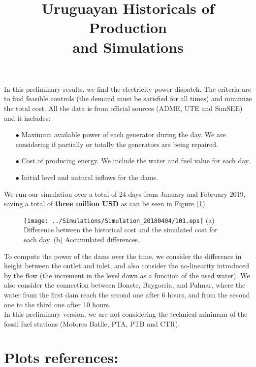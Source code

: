 \documentclass[12pt]{article}
\theoremstyle{definition}
\theoremstyle{remark}
\begin{document}
\title{Uruguayan Historicals of Production\\
and Simulations}
\maketitle

In this preliminary results, we find the electricity power dispatch. The criteria are to find feasible controls (the demand must be satisfied for all times) and minimize the total cost. All the data is from official sources (ADME, UTE and SimSEE) and it includes:
\begin{enumerate}

\item[$\bullet$] Maximum available power of each generator during the day. We are considering if partially or totally the generators are being repaired.

\item[$\bullet$] Cost of producing energy. We include the water and fuel value for each day.

\item[$\bullet$] Initial level and natural inflows for the dams.

\end{enumerate}
We run our simulation over a total of 24 days from January and February 2019, saving a total of \textbf{three million USD} as can be seen in Figure (\ref{F1}).


\begin{figure}[ht!]
\centering
\subfigure
{\texttt{[image: ../Simulations/Simulation\_20180404/101.eps]}}
{(a) Difference between the historical cost and the simulated cost for each day. (b) Accumulated differences.}
\label{F1}
\end{figure}

To compute the power of the dams over the time, we consider the difference in height between the outlet and inlet, and also consider the no-linearity introduced by the flow (the increment in the level down as a function of the used water). We also consider the connection between Bonete, Baygorria, and Palmar, where the water from the first dam reach the second one after 6 hours, and from the second one to the third one after 10 hours.\\
In this preliminary version, we are not considering the technical minimum of the fossil fuel stations (Motores Batlle, PTA, PTB and CTR).

\section*{Plots references:}
\end{document}
